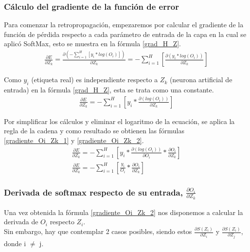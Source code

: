 \subsubsection{Cálculo del gradiente de la función de error}

Para comenzar la retropropagación, empezaremos por calcular el gradiente de la función de pérdida respecto a cada parámetro de entrada de la capa en la cual se aplicó SoftMax, esto se muestra en la fórmula \ref{grad_H_Z}.
\begin{gather}
	\frac{\partial E}{\partial Z_k} = \frac{\partial(- \sum_{i=1}^{H}  [y_i * log(O_i)])}{\partial Z_k} = - \sum_{i=1}^{H}  [\frac{\partial(y_i * log(O_i))}{\partial Z_k}] 
	\label{grad_H_Z}
\end{gather}

Como $y_i$ (etiqueta real) es independiente respecto a $Z_k$ (neurona artificial de entrada) en la fórmula \ref{grad_H_Z}, esta se trata como una constante. \\
\begin{gather}
	\frac{\partial E}{\partial Z_k} = - \sum_{i=1}^{H}  [y_i * \frac{\partial(log(O_i))}{\partial Z_k}] 
	\label{grad_O_K}
\end{gather}

Por simplificar los cálculos y eliminar el logaritmo de la ecuación, se aplica la regla de la cadena y como resultado se obtienen las fórmulas \ref{gradiente_Oi_Zk_1} y \ref{gradiente_Oi_Zk_2}.
\begin{gather}	
	\frac{\partial E}{\partial Z_k} = - \sum_{i=1}^{H}  [y_i * \frac{\partial(log(O_i))}{\partial O_i} * \frac{\partial O_i}{\partial Z_k}]
	\label{gradiente_Oi_Zk_1} \\
	\frac{\partial E}{\partial Z_k} = - \sum_{i=1}^{H}  [\frac{y_i}{O_i} * \frac{\partial O_i}{\partial Z_k}] 
	\label{gradiente_Oi_Zk_2}
\end{gather}


\subsubsection{Derivada de softmax respecto de su entrada, $\frac{\partial O_i}{\partial Z_k}$}

Una vez obtenida la fórmula \ref{gradiente_Oi_Zk_2} nos disponemos a calcular la derivada de $O_i$ respecto $Z_i$. \\
Sin embargo, hay que contemplar 2 casos posibles, siendo estos $\frac{\partial S(Z_i)}{\partial Z_i}$ y $\frac{\partial S(Z_i)}{\partial Z_j}$, donde i $\neq$ j. \\

